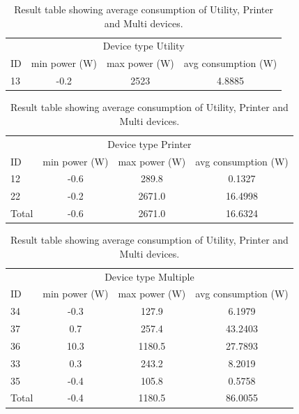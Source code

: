 \begin{table}[h]
	\centering
	\begin{tabular}{l|c|c|c}
		\multicolumn{4}{c}{Device type Utility} \\
		ID & min power (W)& max power (W)& avg consumption (W)\\
		13 & -0.2 & 2523 & 4.8885 \\
	\end{tabular}
	\begin{tabular}{l|c|c|c}
		\multicolumn{4}{c}{Device type Printer} \\
		ID & min power (W)& max power (W)& avg consumption (W)\\
		12 & -0.6 & 289.8 & 0.1327 \\
		22 & -0.2 & 2671.0 & 16.4998 \\
		\hline
		Total & -0.6 & 2671.0 & 16.6324
	\end{tabular}
	\begin{tabular}{l|c|c|c}
		\multicolumn{4}{c}{Device type Multiple} \\
		ID & min power (W)& max power (W)& avg consumption (W)\\
		34 & -0.3 & 127.9 & 6.1979 \\
		37 & 0.7 & 257.4 & 43.2403 \\
		36 & 10.3 & 1180.5 & 27.7893 \\
		33 & 0.3 & 243.2 & 8.2019 \\
		35 & -0.4 & 105.8 & 0.5758 \\
		\hline
		Total & -0.4 & 1180.5 &86.0055 \\ 
	\end{tabular}
	\caption{Result table showing average consumption of Utility, Printer and Multi devices.}
	\label{tab:devices}
\end{table}

